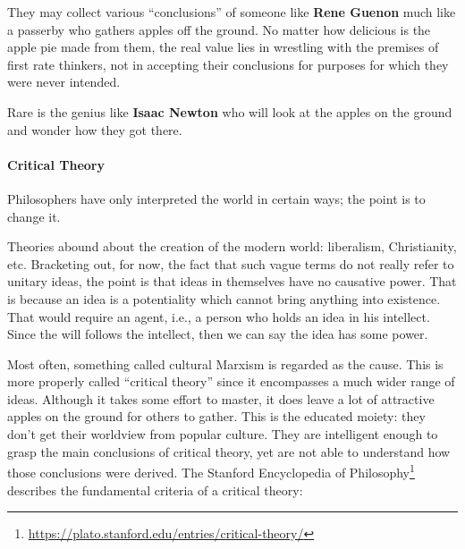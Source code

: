 They may collect various ``conclusions'' of someone like \textbf{Rene Guenon} much like a passerby who gathers apples off the ground. No matter how delicious is the apple pie made from them, the real value lies in wrestling with the premises of first rate thinkers, not in accepting their conclusions for purposes for which they were never intended.

Rare is the genius like \textbf{Isaac Newton} who will look at the apples on the ground and wonder how they got there.

\paragraph{Critical Theory}


\begin{quotex}
Philosophers have only interpreted the world in certain ways; the point is to change it.
\end{quotex}


Theories abound about the creation of the modern world: liberalism, Christianity, etc. Bracketing out, for now, the fact that such vague terms do not really refer to unitary ideas, the point is that ideas in themselves have no causative power. That is because an idea is a potentiality which cannot bring anything into existence. That would require an agent, i.e., a person who holds an idea in his intellect. Since the will follows the intellect, then we can say the idea has some power.

Most often, something called cultural Marxism is regarded as the cause. This is more properly called ``critical theory'' since it encompasses a much wider range of ideas. Although it takes some effort to master, it does leave a lot of attractive apples on the ground for others to gather. This is the educated moiety: they don't get their worldview from popular culture. They are intelligent enough to grasp the main conclusions of critical theory, yet are not able to understand how those conclusions were derived. The Stanford Encyclopedia of Philosophy\footnote{\url{https://plato.stanford.edu/entries/critical-theory/}} describes the fundamental criteria of a critical theory:

